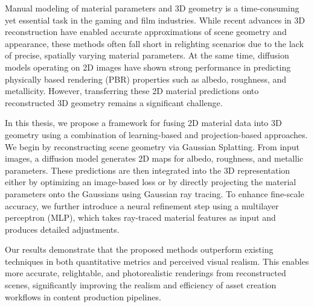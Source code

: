 Manual modeling of material parameters and 3D geometry is a time-consuming yet essential task in the gaming and film industries. While recent advances in 3D reconstruction have enabled accurate approximations of scene geometry and appearance, these methods often fall short in relighting scenarios due to the lack of precise, spatially varying material parameters. At the same time, diffusion models operating on 2D images have shown strong performance in predicting physically based rendering (PBR) properties such as albedo, roughness, and metallicity. However, transferring these 2D material predictions onto reconstructed 3D geometry remains a significant challenge.

In this thesis, we propose a framework for fusing 2D material data into 3D geometry using a combination of learning-based and projection-based approaches. We begin by reconstructing scene geometry via Gaussian Splatting. From input images, a diffusion model generates 2D maps for albedo, roughness, and metallic parameters. These predictions are then integrated into the 3D representation either by optimizing an image-based loss or by directly projecting the material parameters onto the Gaussians using Gaussian ray tracing. To enhance fine-scale accuracy, we further introduce a neural refinement step using a multilayer perceptron (MLP), which takes ray-traced material features as input and produces detailed adjustments.

Our results demonstrate that the proposed methods outperform existing techniques in both quantitative metrics and perceived visual realism. This enables more accurate, relightable, and photorealistic renderings from reconstructed scenes, significantly improving the realism and efficiency of asset creation workflows in content production pipelines. 
